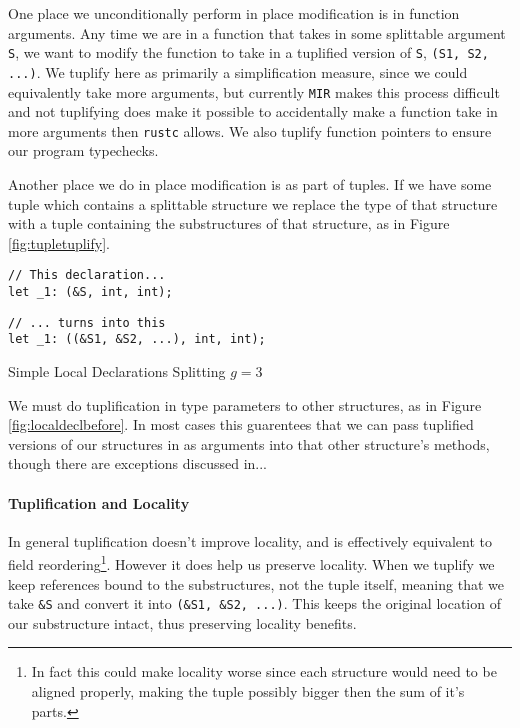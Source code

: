 \documentclass[12pt,oneside]{book}
\newcommand{\rustcname}{{\texttt{rustc}}}
\def \rustc {\rustcname{}\xspace}
\newcommand{\mirname}{{\texttt{MIR}}}
\def \mir {\mirname{}\xspace}
\begin{document}
One place we unconditionally perform in place modification is in function
arguments. Any time we are in a function that takes in some splittable
argument \texttt{S}, we want to modify the function to take 
in a tuplified version of \texttt{S}, \texttt{(S1, S2, ...)}. 
We tuplify here as primarily a simplification measure, since 
we could equivalently take more arguments, but currently
\mir makes this process difficult and
not tuplifying does make it possible to accidentally make a function
take in more arguments then \rustc allows.
We also tuplify function pointers to ensure our program typechecks.

Another place we do in place modification is as part of tuples. If we have some
tuple which contains a splittable structure we replace the type of that
structure with a tuple containing the substructures of that structure, as 
in Figure \ref{fig:tupletuplify}.

\begin{listing}
  \begin{minipage}[t]{0.5\linewidth}
\begin{verbatim}
// This declaration...
let _1: (&S, int, int);
\end{verbatim}
  \end{minipage}
  \begin{minipage}[t]{0.5\linewidth}
\begin{verbatim}
// ... turns into this
let _1: ((&S1, &S2, ...), int, int);
\end{verbatim}
  \end{minipage}
  \caption{Simple Local Declarations Splitting $g = 3$}
  \label{fig:tupletuplify}
\end{listing}

We must do tuplification in type parameters to other structures,
as in Figure \ref{fig:localdeclbefore}.
In most cases this guarentees that we can pass tuplified versions 
of our structures in as
arguments into that other structure's methods, though there are exceptions
discussed in... 

\paragraph{Tuplification and Locality}
In general tuplification
doesn't improve locality, and is effectively equivalent to 
field reordering\footnote{In fact this could make locality worse since each
structure would need to be aligned properly, making the tuple possibly
bigger then the sum of it's parts.}. However it does help us preserve locality.
When we tuplify we keep references bound to the substructures, not the
tuple itself, meaning that we take \texttt{\&S} and convert it into 
\texttt{(\&S1, \&S2, ...)}. This keeps the original location of our 
substructure intact, thus preserving locality benefits.
\end{document}
